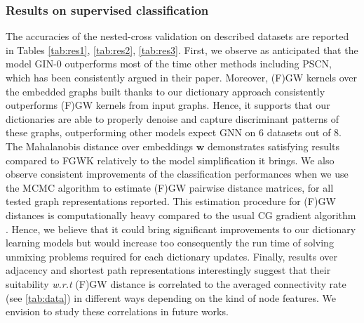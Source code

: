 \documentclass{article}
\def\vw{{\bm{w}}}
\begin{document}
	\subsubsection{Results on supervised classification} The accuracies of the nested-cross validation on described datasets are reported in Tables \ref{tab:res1}, \ref{tab:res2}, \ref{tab:res3}. First, we observe as anticipated that the model GIN-0 \citep{xu2018powerful} outperforms most of the time other methods including PSCN, which has been consistently argued in their paper. Moreover, (F)GW kernels over the embedded graphs built thanks to our dictionary approach consistently outperforms (F)GW kernels from input graphs. Hence, it supports that our dictionaries are able to properly denoise and capture discriminant patterns of these graphs, outperforming other models expect GNN on 6 datasets out of 8. The Mahalanobis distance over embeddings $\vw$ demonstrates satisfying results compared to FGWK relatively to the model simplification it brings. We also observe consistent improvements of the classification performances when we use the MCMC algorithm \citep{chowdhury-generalized-2020} to estimate (F)GW pairwise distance matrices, for all tested graph representations reported. This estimation procedure for (F)GW distances is computationally heavy compared to the usual CG gradient algorithm \citep{vayer-fused-2018}. Hence, we believe that it could bring significant improvements to our dictionary learning models but would increase too consequently the run time of solving unmixing problems required for each dictionary updates. Finally, results over adjacency and shortest path representations interestingly suggest that their suitability \emph{w.r.t} (F)GW distance is correlated to the averaged connectivity rate (see \ref{tab:data}) in different ways depending on the kind of node features. We envision to study these correlations in future works.
	\vspace{-4mm}
\end{document}
